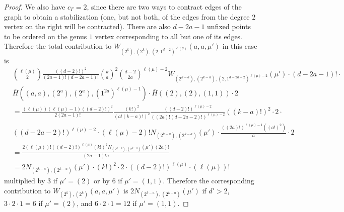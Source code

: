 \documentclass[thesis]{thesis-umich}           %
\theoremstyle{definition}
\begin{document}
\begin{proof}
                
                We also have $c_{\Gamma}=2$, since there are two ways to contract
                edges of the graph to obtain a stabilization (one, but not
                both, of the edges from the degree $2$ vertex on the right
                will be contracted).
                There are also $d-2a-1$ unfixed points to be ordered
                on the genus $1$ vertex
                corresponding to all but one of its edges.
                Therefore the total
                contribution to $W_{(2^k),(2^k),(2,1^{d-2})^{\ell(\mu)}}(a,a,\mu')$ in this case is
                \begin{align*}
                  &\binom{\ell(\mu)}{2}\frac{((d-2)!)^2}{(2a-1)!(d-2a-1)!}\binom ka^2\binom{d-2}{2a}^{\ell(\mu)-2}W_{(2^{k-a}),(2^{k-a}),(2,1^{d-2a-2})^{\ell(\mu)-2}}(\mu')\cdot (d-2a-1)!\cdot  \\
                  &
                  \overline H((a,a),(2^a),(2^a),(1^{2a})^{\ell(\mu)-1}) \cdot
                  \overline H((2),(2),(1,1))\cdot 2 \\
                  &=\frac{(\ell(\mu))(\ell(\mu)-1)((d-2)!)^2}{2(2a-1)!}\frac{(k!)^2}{(a!(k-a)!)^2}\frac{((d-2)!)^{\ell(\mu)-2}}{((2a)!(d-2a-2)!)^{\ell(\mu)-2}}((k-a)!)^2\cdot 2 \cdot \\
                  &((d-2a-2)!)^{\ell(\mu)-2}\cdot (\ell(\mu)-2)!N_{(2^{k-a}),(2^{k-a})}(\mu')\cdot\frac{((2a)!)^{\ell(\mu)-1}((a!)^2)}{a}\cdot 2 \\
                  &=\frac{2(\ell(\mu))!((d-2)!)^{\ell(\mu)}(k!)^2N_{(2^{k-a}),(2^{k-a})}(\mu')
                  (2a)!}{(2a-1)!a} \\
                  &=2N_{(2^{k-a}),(2^{k-a})}(\mu')\cdot (k!)^2\cdot 2\cdot ((d-2)!)^{\ell(\mu)}\cdot (\ell(\mu))!
                \end{align*}
                multiplied by $3$ if $\mu'=(2)$ or by $6$ if $\mu'=(1,1)$.
                Therefore the corresponding contribution
                to $W_{(2^k),(2^k)}(a,a,\mu')$ is $2N_{(2^{k-a}),(2^{k-a})}(\mu')$
                if $d'>2$, $3\cdot 2\cdot 1=6$ if $\mu'=(2)$, and
                $6\cdot 2\cdot 1=12$ if $\mu'=(1,1)$.

\end{proof}
\end{document}
